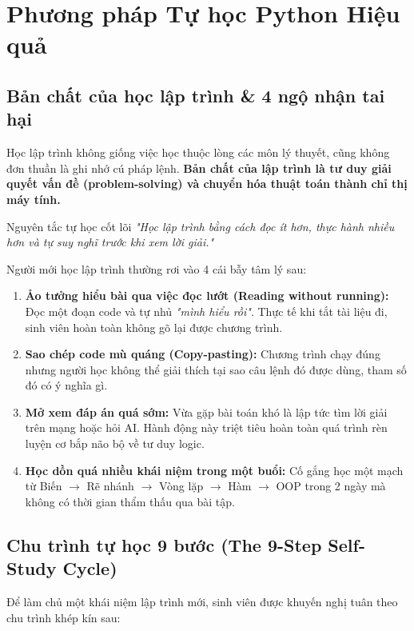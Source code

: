 \documentclass[11pt,a4paper]{article}
\begin{document}
\newpage
\section{Phương pháp Tự học Python Hiệu quả}

\subsection{Bản chất của học lập trình \& 4 ngộ nhận tai hại}
Học lập trình không giống việc học thuộc lòng các môn lý thuyết, cũng không đơn thuần là ghi nhớ cú pháp lệnh. \textbf{Bản chất của lập trình là tư duy giải quyết vấn đề (problem-solving) và chuyển hóa thuật toán thành chỉ thị máy tính.}

\begin{tipbox}{Nguyên tắc tự học cốt lõi}
\textit{"Học lập trình bằng cách đọc ít hơn, thực hành nhiều hơn và tự suy nghĩ trước khi xem lời giải."}
\end{tipbox}

Người mới học lập trình thường rơi vào 4 cái bẫy tâm lý sau:
\begin{enumerate}[leftmargin=1.5em, itemsep=3pt]
    \item \textbf{Ảo tưởng hiểu bài qua việc đọc lướt (Reading without running):} Đọc một đoạn code và tự nhủ \textit{"mình hiểu rồi"}. Thực tế khi tắt tài liệu đi, sinh viên hoàn toàn không gõ lại được chương trình.
    \item \textbf{Sao chép code mù quáng (Copy-pasting):} Chương trình chạy đúng nhưng người học không thể giải thích tại sao câu lệnh đó được dùng, tham số đó có ý nghĩa gì.
    \item \textbf{Mở xem đáp án quá sớm:} Vừa gặp bài toán khó là lập tức tìm lời giải trên mạng hoặc hỏi AI. Hành động này triệt tiêu hoàn toàn quá trình rèn luyện cơ bắp não bộ về tư duy logic.
    \item \textbf{Học dồn quá nhiều khái niệm trong một buổi:} Cố gắng học một mạch từ Biến $\rightarrow$ Rẽ nhánh $\rightarrow$ Vòng lặp $\rightarrow$ Hàm $\rightarrow$ OOP trong 2 ngày mà không có thời gian thẩm thấu qua bài tập.
\end{enumerate}

\subsection{Chu trình tự học 9 bước (The 9-Step Self-Study Cycle)}
Để làm chủ một khái niệm lập trình mới, sinh viên được khuyến nghị tuân theo chu trình khép kín sau:
\end{document}
